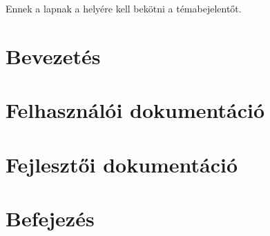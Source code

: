 \documentclass[twoside, 12pt]{article}
\begin{document}


% 
Ennek a lapnak a helyére kell bekötni a témabejelentőt.
\newpage

\setcounter{page}{1}
\pagestyle{empty}
\tableofcontents

\newpage
\pagestyle{plain}
\part{Bevezetés}



\newpage\part{Felhasználói dokumentáció}






\newpage\part{Fejlesztői dokumentáció}





% 
% 


\newpage\part{Befejezés}




\end{document}

